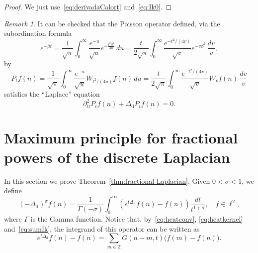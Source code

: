 \documentclass[11pt]{amsart}
\numberwithin{equation}{section}
\newcommand{\Z}{\mathbb{Z}}
\newcommand{\dis}{\mathrm{d}}
\theoremstyle{plain}
\theoremstyle{remark}
\newtheorem{rem}{Remark}
\begin{document}
\begin{proof}
We just use~\eqref{eq:derivadaCalort} and~\eqref{eq:Ik0}.
\end{proof}

\begin{rem}\label{Poisson}
It can be checked that the Poisson operator defined, via the subordination formula
\begin{equation} \label{subordination}
e^{-\beta t}=\frac{1}{\sqrt\pi} \int_0^{\infty} \frac{e^{-u}}{\sqrt u}e^{-\frac{t^2 \beta^2}{4u}}\,du
= \frac{t}{2\sqrt\pi} \int_0^{\infty} \frac{e^{- t^2/(4v)}}{\sqrt {v}}e^{-v\beta^2}\,\frac{dv}{v},
\end{equation}
by
\begin{equation}
\label{eq:Poissonsub}
P_tf(n) = \frac{1}{\sqrt\pi} \int_0^{\infty} \frac{e^{-u}}{\sqrt u}W_{t^2/(4u)}f(n)\,du
= \frac{t}{2\sqrt\pi} \int_0^{\infty} \frac{e^{- t^2/(4v)}}{\sqrt {v}}W_vf(n)\,\frac{dv}{v}
\end{equation}
satisfies the ``Laplace'' equation
\[
\partial^2_{tt} P_tf(n) + \Delta_{\dis} P_tf(n)=0.
\]
\end{rem}

\section{Maximum principle for fractional powers of the discrete Laplacian}
\label{sec:maximum}

In this section we prove Theorem~\ref{thm:fractional-Laplacian}.
Given $0<\sigma < 1$, we define
\begin{equation}
\label{fraccionario}
(-\Delta_{\dis})^\sigma f (n)= \frac1{\Gamma(-\sigma)} \int_0^\infty
(e^{t\Delta_{\dis}}f(n) -f(n) )\frac{dt}{t^{1+\sigma}}, \quad f \in\ell^2,
\end{equation}
where $\Gamma$ is the Gamma function.
Notice that, by~\eqref{eq:heatconv}, \eqref{eq:heatkernel} and~\eqref{eq:sumIk}, the integrand of this operator can be written as
\begin{equation}
\label{fracaux}
  e^{t\Delta_{\dis}}f(n) - f(n) = \sum_{m\in \Z} G(n-m,t) \big(f(m)-f(n) \big).
\end{equation}
\end{document}
